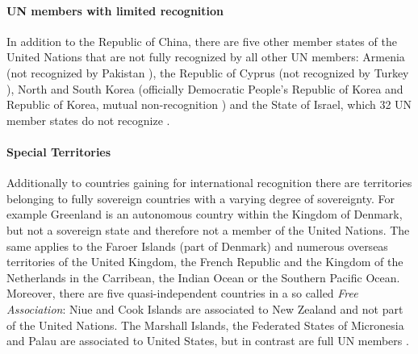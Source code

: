 
\paragraph{UN members with limited recognition} %
\label{par:un_members_with_limited_recognition}

In addition to the Republic of China, there are five other member states of the United Nations that are not fully recognized by all other UN members: Armenia (not recognized by Pakistan \cite{ArmeniaRecognition}), the Republic of Cyprus (not recognized by Turkey \cite{CyprusRecognition}), North and South Korea (officially Democratic People's Republic of Korea and Republic of Korea, mutual non-recognition \cite{KoreaRecognition}) and the State of Israel, which 32 UN member states do not recognize \cite{IsraelRecognition}.


\paragraph{Special Territories} %
\label{par:special_territories}

Additionally to countries gaining for international recognition there are territories belonging to fully sovereign countries with a varying degree of sovereignty. For example Greenland is an autonomous country within the Kingdom of Denmark, but not a  sovereign state and therefore not a member of the United Nations. The same applies to the Faroer Islands (part of Denmark) and numerous overseas territories of the United Kingdom, the French Republic and the Kingdom of the Netherlands in the Carribean, the Indian Ocean or the Southern Pacific Ocean. Moreover, there are five quasi-independent countries in a so called \emph{Free Association}: Niue and Cook Islands are associated to New Zealand and not part of the United Nations. The Marshall Islands, the Federated States of Micronesia and Palau are associated to United States, but in contrast are full UN members \cite{SpecialTerritories}.


